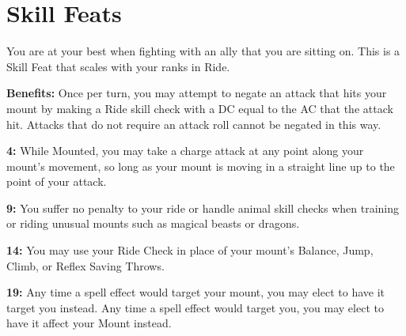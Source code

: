 \section{Skill Feats}


You are at your best when fighting with an ally that you are sitting on. This is a Skill Feat that scales with your ranks in Ride.

\textbf{Benefits:} Once per turn, you may attempt to negate an attack that hits your mount by making a Ride skill check with a DC equal to the AC that the attack hit. Attacks that do not require an attack roll cannot be negated in this way.

\textbf{4:} While Mounted, you may take a charge attack at any point along your mount's movement, so long as your mount is moving in a straight line up to the point of your attack.

\textbf{9:} You suffer no penalty to your ride or handle animal skill checks when training or riding unusual mounts such as magical beasts or dragons.

\textbf{14:} You may use your Ride Check in place of your mount's Balance, Jump, Climb, or Reflex Saving Throws.

\textbf{19:} Any time a spell effect would target your mount, you may elect to have it target you instead. Any time a spell effect would target you, you may elect to have it affect your Mount instead.
